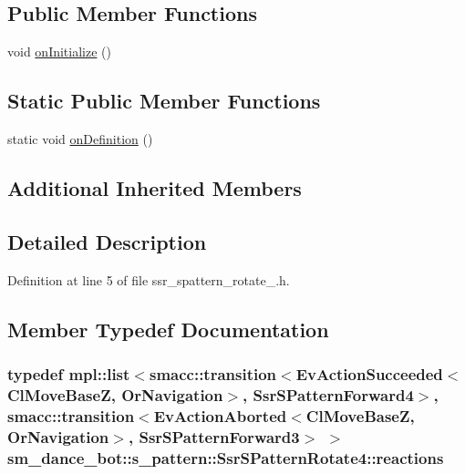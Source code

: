 \subsection*{Public Member Functions}
\begin{DoxyCompactItemize}
\item 
void \hyperlink{structsm__dance__bot_1_1s__pattern_1_1SsrSPatternRotate4_af450a62792e0fdfe40c4071b5425d18b}{on\+Initialize} ()
\end{DoxyCompactItemize}
\subsection*{Static Public Member Functions}
\begin{DoxyCompactItemize}
\item 
static void \hyperlink{structsm__dance__bot_1_1s__pattern_1_1SsrSPatternRotate4_a10c3286e13988243516b6a6c6b5582b5}{on\+Definition} ()
\end{DoxyCompactItemize}
\subsection*{Additional Inherited Members}


\subsection{Detailed Description}


Definition at line 5 of file ssr\+\_\+spattern\+\_\+rotate\+\_.\+h.



\subsection{Member Typedef Documentation}
\subsubsection[{\texorpdfstring{reactions}{reactions}}]{\setlength{\rightskip}{0pt plus 5cm}typedef mpl\+::list$<${\bf smacc\+::transition}$<$Ev\+Action\+Succeeded$<${\bf Cl\+Move\+BaseZ}, {\bf Or\+Navigation}$>$, {\bf Ssr\+S\+Pattern\+Forward4}$>$, {\bf smacc\+::transition}$<$Ev\+Action\+Aborted$<${\bf Cl\+Move\+BaseZ}, {\bf Or\+Navigation}$>$, {\bf Ssr\+S\+Pattern\+Forward3}$>$ $>$ {\bf sm\+\_\+dance\+\_\+bot\+::s\+\_\+pattern\+::\+Ssr\+S\+Pattern\+Rotate4\+::reactions}}\hypertarget{structsm__dance__bot_1_1s__pattern_1_1SsrSPatternRotate4_a608f0a7a2bd1ab1b278741e2b8a4ea94}{}\label{structsm__dance__bot_1_1s__pattern_1_1SsrSPatternRotate4_a608f0a7a2bd1ab1b278741e2b8a4ea94}



